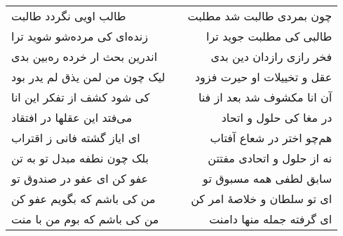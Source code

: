 \begin{center}
\begin{longtable}{l p{0.5cm} r}
طالب اویی نگردد طالبت
&&
چون بمردی طالبت شد مطلبت
\\
زنده‌ای کی مرده‌شو شوید ترا
&&
طالبی کی مطلبت جوید ترا
\\
اندرین بحث ار خرده ره‌بین بدی
&&
فخر رازی رازدان دین بدی
\\
لیک چون من لمن یذق لم یدر بود
&&
عقل و تخییلات او حیرت فزود
\\
کی شود کشف از تفکر این انا
&&
آن انا مکشوف شد بعد از فنا
\\
می‌فتد این عقلها در افتقاد
&&
در مغا کی حلول و اتحاد
\\
ای ایاز گشته فانی ز اقتراب
&&
هم‌چو اختر در شعاع آفتاب
\\
بلک چون نطفه مبدل تو به تن
&&
نه از حلول و اتحادی مفتتن
\\
عفو کن ای عفو در صندوق تو
&&
سابق لطفی همه مسبوق تو
\\
من کی باشم که بگویم عفو کن
&&
ای تو سلطان و خلاصهٔ امر کن
\\
من کی باشم که بوم من با منت
&&
ای گرفته جمله منها دامنت
\\
\end{longtable}
\end{center}
